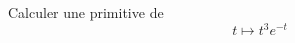 Calculer une primitive de
\begin{displaymath}
  t \mapsto  t^3e^{-t}
\end{displaymath}
\bigskip \bigskip 